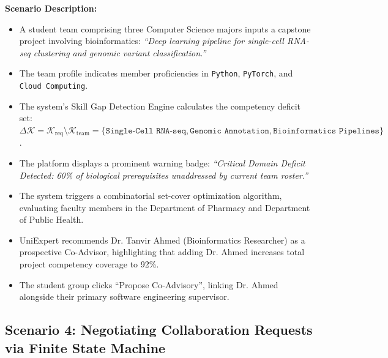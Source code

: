 \noindent\textbf{Scenario Description:}
\begin{itemize}[label=\textbf{\tiny\ensuremath{\blacksquare}}]
    \item A student team comprising three Computer Science majors inputs a capstone project involving bioinformatics: \textit{``Deep learning pipeline for single-cell RNA-seq clustering and genomic variant classification.''}
    \item The team profile indicates member proficiencies in \texttt{Python}, \texttt{PyTorch}, and \texttt{Cloud Computing}.
    \item The system's Skill Gap Detection Engine calculates the competency deficit set: $\Delta \mathcal{K} = \mathcal{K}_{\text{req}} \setminus \mathcal{K}_{\text{team}} = \{\texttt{Single-Cell RNA-seq}, \texttt{Genomic Annotation}, \texttt{Bioinformatics Pipelines}\}$.
    \item The platform displays a prominent warning badge: \textit{``Critical Domain Deficit Detected: 60\% of biological prerequisites unaddressed by current team roster.''}
    \item The system triggers a combinatorial set-cover optimization algorithm, evaluating faculty members in the Department of Pharmacy and Department of Public Health.
    \item UniExpert recommends Dr. Tanvir Ahmed (Bioinformatics Researcher) as a prospective Co-Advisor, highlighting that adding Dr. Ahmed increases total project competency coverage to 92\%.
    \item The student group clicks ``Propose Co-Advisory'', linking Dr. Ahmed alongside their primary software engineering supervisor.
\end{itemize}

\subsection{Scenario 4: Negotiating Collaboration Requests via Finite State Machine}
\label{subsec:scenario4}

